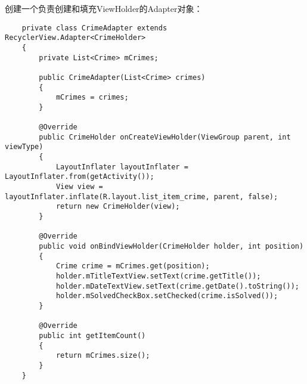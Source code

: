 \documentclass[a4paper,left=2.5cm,right=2.5cm,11pt]{article}
\begin{document}
	创建一个负责创建和填充ViewHolder的Adapter对象：
	\begin{lstlisting}
	private class CrimeAdapter extends RecyclerView.Adapter<CrimeHolder>
    {
        private List<Crime> mCrimes;

        public CrimeAdapter(List<Crime> crimes)
        {
            mCrimes = crimes;
        }

        @Override
        public CrimeHolder onCreateViewHolder(ViewGroup parent, int viewType)
        {
            LayoutInflater layoutInflater = LayoutInflater.from(getActivity());
            View view = layoutInflater.inflate(R.layout.list_item_crime, parent, false);
            return new CrimeHolder(view);
        }

        @Override
        public void onBindViewHolder(CrimeHolder holder, int position)
        {
            Crime crime = mCrimes.get(position);
            holder.mTitleTextView.setText(crime.getTitle());
            holder.mDateTextView.setText(crime.getDate().toString());
            holder.mSolvedCheckBox.setChecked(crime.isSolved());
        }

        @Override
        public int getItemCount()
        {
            return mCrimes.size();
        }
    }
	\end{lstlisting}
\end{document}
